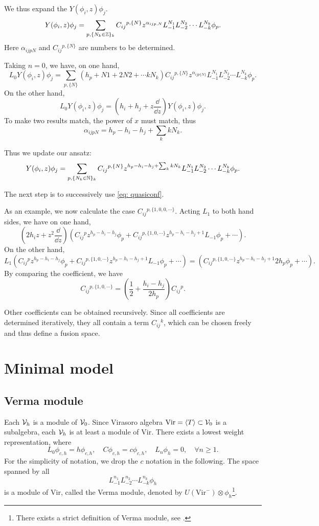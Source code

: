 \documentclass{article}
\begin{document}
We thus expand the $Y(\phi_i, z)\phi_j$. 
\[
Y(\phi_i, z)\phi_j = \sum_{p, \{N_k\in\mathbb{Z}\}_{k}}C_{ij}{}^{p,\{N\}}z^{\alpha_{ijp,{N}}}L_{-1}^{N_1}L_{-2}^{N_2}\cdots L_{-k}^{N_k}\phi_p.
\]
Here $\alpha_{ijpN}$ and $C_{ij}{}^{p,\{N\}}$ are numbers to be determined.

Taking $n = 0$, we have, on one hand,
\[
L_0 Y(\phi_i, z)\phi_j = \sum_{p,\{N\}}(h_p+N1+2N2+\cdots kN_k)C_{ij}{}^{p,\{N\}}z^{\alpha_{ijp\{N\}}}L_{-1}^{N_1}L_{-2}^{N_2}\cdots L_{-k}^{N_k}\phi_p.
\]
On the other hand, 
\[
L_0 Y(\phi_i, z)\phi_j = \left(h_i+h_j+z\frac{\dd}{\dd z}\right)Y(\phi_i,z)\phi_j.
\]
To make two results match, the power of $x$ must match, thus
\[
\alpha_{ijpN} = h_p-h_i-h_j+\sum_{k}kN_k.
\]

Thus we update our ansatz:
\[
Y(\phi_i, z)\phi_j = \sum_{p, \{N_k\in\mathbb{N}\}_{k}}C_{ij}{}^{p,\{N\}}z^{h_p-h_i-h_j+\sum_{k}kN_k}L_{-1}^{N_1}L_{-2}^{N_2}\cdots L_{-k}^{N_k}\phi_p.
\]

The next step is to successively use \eqref{eq: quasiconf}. 

As an example, we now calculate the case $C_{ij}{}^{p,\{1,0,0,\cdots\}}$. Acting $L_1$ to both hand sides, we have on one hand, 
\[
\left(2h_i z + z^2\frac{\dd}{\dd z}\right)\left(C_{ij}{}^p z^{h_p-h_i-h_j}\phi_p+C_{ij}{}^{p,\{1,0,\cdots\}}z^{h_p-h_i-h_j+1}L_{-1}\phi_p + \cdots\right).
\]
On the other hand,
\[
L_1\left(C_{ij}{}^p z^{h_p-h_i-h_j}\phi_p+C_{ij}{}^{p,\{1,0,\cdots\}}z^{h_p-h_i-h_j+1}L_{-1}\phi_p + \cdots\right) = \left(C_{ij}{}^{p,\{1,0,\cdots\}}z^{h_p-h_i-h_j+1}2h_p\phi_p + \cdots\right).
\]
By comparing the coefficient, we have
\[
C_{ij}{}^{p,\{1,0,\cdots\}} = \left(\frac{1}{2} + \frac{h_i-h_j}{2h_p}\right) C_{ij}{}^{p}.
\]

Other coefficients can be obtained recursively. Since all coefficients are determined iteratively, they all contain a term $C_{ij}{}^k$, which can be chosen freely and thus define a fusion space.

\section{Minimal model}
\subsection{Verma module}
Each ${\cal V}_h$ is a module of ${\cal V}_0$. Since Virasoro algebra $\mathrm{Vir} = \langle T\rangle\subset {\cal V}_0$ is a subalgebra, each ${\cal V}_h$ is at least a module of $\mathrm{Vir}$. There exists a lowest weight representation, where
\[
L_0\phi_{c,h} = h\phi_{c,h},\quad C\phi_{c,h} = c\phi_{c,h},\quad L_{n}\phi_h = 0,\quad \forall n\geq 1.
\]
For the simplicity of notation, we drop the $c$ notation in the following. The space spanned by all
\[
L_{-1}^{n_1}L_{-2}^{n_2}\cdots L_{-k}^{n_k}\phi_{h}
\]
is a module of $\mathrm{Vir}$, called the Verma module, denoted by $U(\mathrm{Vir}^-)\otimes \phi_h$\footnote{There exists a strict definition of Verma module, see \cite{Wikipedia:Verma_module}.}.
\end{document}
